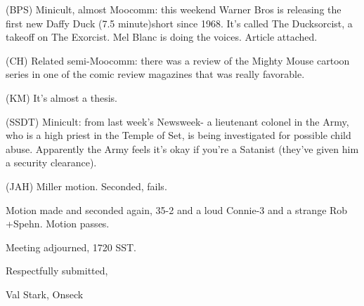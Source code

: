 \documentclass[12pt]{article}
\begin{document}
(BPS) Minicult, almost Moocomm: this weekend Warner Bros is releasing the first new Daffy Duck (7.5 minute)short since 1968. It's called The Ducksorcist, a takeoff on The Exorcist. Mel Blanc is doing the voices. Article attached.

(CH) Related semi-Moocomm: there was a review of the Mighty Mouse cartoon series in one of the comic review magazines that was really favorable.

(KM) It's almost a thesis.

(SSDT) Minicult: from last week's Newsweek- a lieutenant colonel in the Army, who is a high priest in the Temple of Set, is being investigated for possible child abuse. Apparently the Army feels it's okay if you're a Satanist (they've given him a security clearance).

(JAH) Miller motion. Seconded, fails.

Motion made and seconded again, 35-2 and a loud Connie-3 and a strange Rob +Spehn. Motion passes.

\vspace{12pt}

\noindent
Meeting adjourned, 1720 SST.

\vspace{18pt}

\centerline{Respectfully submitted,}
\centerline{Val Stark, Onseck}
\end{document}
